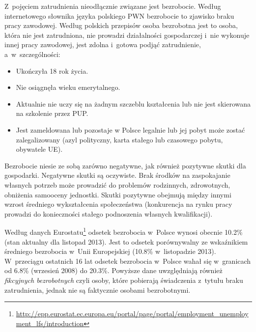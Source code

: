 \documentclass[12pt]{article}
\begin{document}
    Z~pojęciem zatrudnienia nieodłącznie związane jest bezrobocie. Według internetowego słownika języka polskiego PWN\cite{sjp} bezrobocie to zjawisko braku pracy zawodowej. Według polskich przepisów osoba bezrobotna jest to osoba, która nie jest zatrudniona, nie prowadzi działalności gospodarczej i~nie wykonuje innej pracy zawodowej, jest zdolna i~gotowa podjąć zatrudnienie, a~w~szczególności\cite{ust:pro:zat}:
    
    \begin{itemize}
        \item Ukończyła 18 rok życia.
        \item Nie osiągnęła wieku emerytalnego.
        \item Aktualnie nie uczy się na żadnym szczeblu kształcenia lub nie jest skierowana na szkolenie przez PUP.
        \item Jest zameldowana lub pozostaje w Polsce legalnie lub jej pobyt może zostać zalegalizowany (azyl polityczny, karta stałego lub czasowego pobytu, obywatele UE).
    \end{itemize}
    
    Bezrobocie niesie ze sobą zarówno negatywne, jak również pozytywne skutki dla gospodarki. Negatywne skutki są oczywiste. Brak środków na zaspokajanie własnych potrzeb może prowadzić do problemów rodzinnych, zdrowotnych, obniżenia samooceny jednostki. Skutki pozytywne obejmują między innymi wzrost średniego wykształcenia społeczeństwa (konkurencja na rynku pracy prowadzi do konieczności stałego podnoszenia własnych kwalifikacji).
    
    Według danych Eurostatu\footnote{\url{http://epp.eurostat.ec.europa.eu/portal/page/portal/employment_unemployment_lfs/introduction}} odsetek bezrobocia w~Polsce wynosi obecnie 10.2\% (stan aktualny dla listopad 2013). Jest to odsetek porównywalny ze wskaźnikiem średniego bezrobocia w~Unii Europejskiej (10.8\% w~listopadzie 2013). W~przeciągu ostatnich 16 lat odsetek bezrobocia w~Polsce wahał się w~granicach od 6.8\% (wrzesień 2008) do 20.3\%. Powyższe dane uwzględniają również \emph{fikcyjnych bezrobotnych} czyli osoby, które pobierają świadczenia z~tytułu braku zatrudnienia, jednak nie są faktycznie osobami bezrobotnymi.
    
\end{document}
